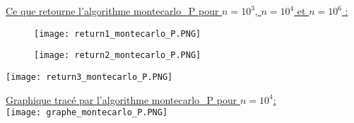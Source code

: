 \documentclass{article}
\theoremstyle{exostyle}
\begin{document}
\begin{appendices}
\newpage

\underline{Ce que retourne l'algorithme montecarlo\_P pour $n = 10^{3}$, $n = 10^{4}$ et $n = 10^{6}$ :}

\begin{figure}[h]
    \begin{minipage}[c]{.46\linewidth}
        \centering
        \texttt{[image: return1\_montecarlo\_P.PNG]}
    \end{minipage}
    \hfill
    \begin{minipage}[c]{.46\linewidth}
        \centering
        \texttt{[image: return2\_montecarlo\_P.PNG]}
    \end{minipage}
\end{figure}


\texttt{[image: return3\_montecarlo\_P.PNG]}

\newpage

\hspace{-1.7cm}\underline{Graphique tracé par l'algorithme montecarlo\_P pour $n=10^{4}$:}\\

\hspace{-1.7cm}\texttt{[image: graphe\_montecarlo\_P.PNG]}

\end{appendices}


\newpage
\end{document}
